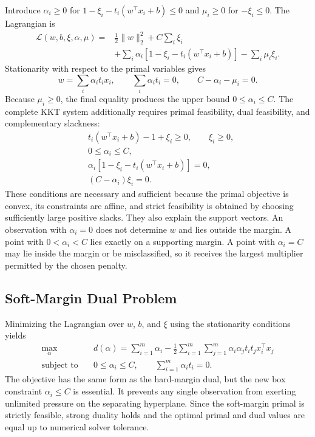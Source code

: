 \documentclass[11pt,a4paper]{article}
\numberwithin{equation}{section} %
\begin{document}
Introduce $\alpha_i\geq0$ for
$1-\xi_i-t_i(w^\top x_i+b)\leq0$ and $\mu_i\geq0$ for
$-\xi_i\leq0$. The Lagrangian is
\begin{equation}
\begin{aligned}
\mathcal{L}(w,b,\xi,\alpha,\mu)
={}&\frac12\lVert w\rVert_2^2+C\sum_i\xi_i\\
&+\sum_i\alpha_i[1-\xi_i-t_i(w^\top x_i+b)]
-\sum_i\mu_i\xi_i.
\end{aligned}
\end{equation}
Stationarity with respect to the primal variables gives
\begin{equation}
    w=\sum_i\alpha_i t_i x_i,\qquad
    \sum_i\alpha_i t_i=0,\qquad
    C-\alpha_i-\mu_i=0.
\end{equation}
Because $\mu_i\geq0$, the final equality produces the upper bound
$0\leq\alpha_i\leq C$. The complete KKT system additionally requires primal
feasibility, dual feasibility, and complementary slackness:
\begin{equation}
\begin{aligned}
&t_i(w^\top x_i+b)-1+\xi_i\geq0,\qquad \xi_i\geq0,\\
&0\leq\alpha_i\leq C,\\
&\alpha_i[1-\xi_i-t_i(w^\top x_i+b)]=0,\\
&(C-\alpha_i)\xi_i=0.
\end{aligned}
\end{equation}
These conditions are necessary and sufficient because the primal objective is
convex, its constraints are affine, and strict feasibility is obtained by
choosing sufficiently large positive slacks. They also explain the support
vectors. An observation with $\alpha_i=0$ does not determine $w$ and lies
outside the margin. A point with $0<\alpha_i<C$ lies exactly on a supporting
margin. A point with $\alpha_i=C$ may lie inside the margin or be
misclassified, so it receives the largest multiplier permitted by the chosen
penalty.

\subsection{Soft-Margin Dual Problem}

Minimizing the Lagrangian over $w$, $b$, and $\xi$ using the stationarity
conditions yields
\begin{equation}
\begin{aligned}
\max_{\alpha}\quad
&d(\alpha)=\sum_{i=1}^{m}\alpha_i
-\frac12\sum_{i=1}^{m}\sum_{j=1}^{m}
\alpha_i\alpha_jt_it_jx_i^\top x_j\\
\text{subject to}\quad
&0\leq\alpha_i\leq C,\qquad
\sum_{i=1}^{m}\alpha_it_i=0.
\end{aligned}
\end{equation}
The objective has the same form as the hard-margin dual, but the new box
constraint $\alpha_i\leq C$ is essential. It prevents any single observation
from exerting unlimited pressure on the separating hyperplane. Since the
soft-margin primal is strictly feasible, strong duality holds and the optimal
primal and dual values are equal up to numerical solver tolerance.
\end{document}

